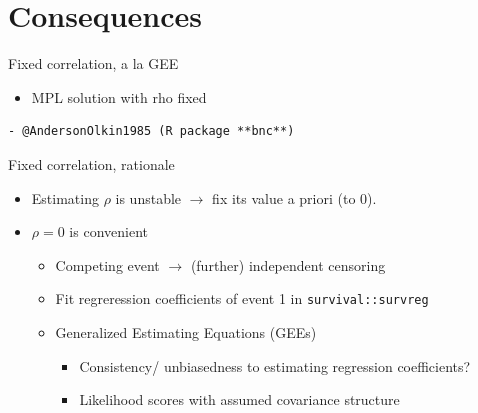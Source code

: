 \documentclass[10pt]{beamer}
\providecommand{\tightlist}{%
\setlength{\itemsep}{0pt}\setlength{\parskip}{0pt}}
\begin{document}






\section{Consequences}


\begin{frame}[fragile]{Fixed correlation, a la GEE}
\protect\hypertarget{fixed-correlation-a-la-gee}{}

\begin{itemize}
\tightlist
\item
  MPL solution with rho fixed
\end{itemize}

\begin{verbatim}
- @AndersonOlkin1985 (R package **bnc**)
\end{verbatim}

\begin{block}{Fixed correlation, rationale}

\begin{itemize}
\tightlist
\item
  Estimating \(\rho\) is unstable \(\to\) fix its value a priori (to 0).
\item
  \(\rho=0\) is convenient

  \begin{itemize}
  \tightlist
  \item
    Competing event \(\to\) (further) independent censoring
  \item
    Fit regreression coefficients of event 1 in
    \texttt{survival::survreg}
  \item
    Generalized Estimating Equations (GEEs)

    \begin{itemize}
    \tightlist
    \item
      Consistency/ unbiasedness to estimating regression coefficients?
    \item
      Likelihood scores with assumed covariance structure
    \end{itemize}
  \end{itemize}
\end{itemize}
\end{block}

\end{frame}
\end{document}
